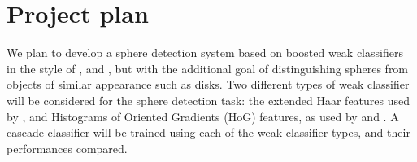 \documentclass[11pt]{scrartcl}
\begin{document}
	\section{Project plan} {
    \label{sec:plan}



        We plan to develop a sphere detection system based on boosted weak
        classifiers in the style of \citeauthor{zhang2013novel}, and
        \citeauthor{masselli2013haar}, but with the additional goal of
        distinguishing spheres from objects of similar appearance such as
        disks. %
        Two different types of weak classifier will be considered for the sphere detection task: the extended Haar features used by \citet{zhang2013novel},
        and Histograms of Oriented Gradients (HoG) features,
        as used by \citet{dalal2005histograms} and \citet{zhu2006hogs}.
        A cascade classifier will be trained using each of the weak classifier types, and their performances compared.


}
\end{document}
